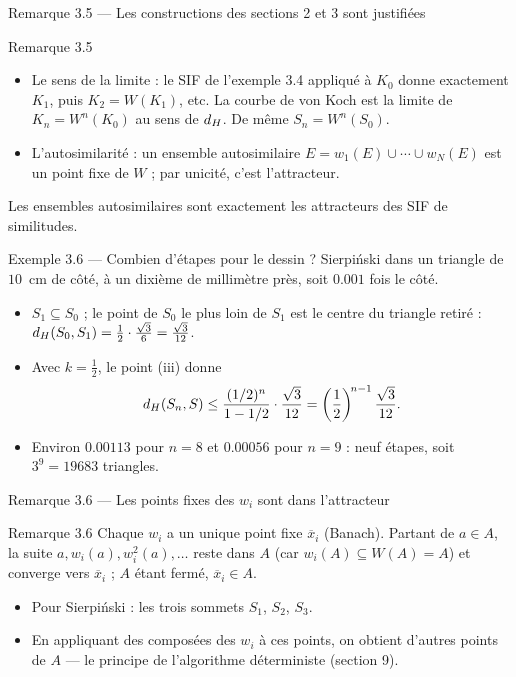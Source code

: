 \begin{frame}{Remarque 3.5 --- Les constructions des sections 2 et 3 sont justifiées}
  \begin{Rem}{Remarque 3.5}
    \small
    \begin{itemize}
      \item Le sens de la limite : le SIF de l'exemple 3.4 appliqué à
        $K_0$ donne exactement $K_1$, puis $K_2=W(K_1)$, etc. La courbe de
        von Koch est la limite de $K_n=W^n(K_0)$ au sens de $d_H$. De même
        $S_n=W^n(S_0)$.
      \item L'autosimilarité : un ensemble autosimilaire
        $E=w_1(E)\cup\cdots\cup w_N(E)$ est un point fixe de $W$ ; par
        unicité, c'est l'attracteur.
    \end{itemize}
    Les ensembles autosimilaires sont exactement les attracteurs des SIF
    de similitudes.
  \end{Rem}
\end{frame}

\begin{frame}{Exemple 3.6 --- Combien d'étapes pour le dessin ?}
  \small Sierpiński dans un triangle de $10$~cm de côté, à un dixième de
  millimètre près, soit $\num{0.001}$ fois le côté.
  \begin{itemize}
    \item $S_1\subseteq S_0$ ; le point de $S_0$ le plus loin de $S_1$
      est le centre du triangle retiré :
      $d_H(S_0,S_1) = \tfrac12\cdot\tfrac{\sqrt3}{6} = \tfrac{\sqrt3}{12}$.
    \item Avec $k=\tfrac12$, le point (iii) donne
      \[
        d_H(S_n,S)\leq\frac{(1/2)^n}{1-1/2}\cdot\frac{\sqrt3}{12}
        = \left(\frac12\right)^{\!n-1}\frac{\sqrt3}{12}.
      \]
    \item Environ $\num{0.00113}$ pour $n=8$ et $\num{0.00056}$ pour
      $n=9$ : neuf étapes, soit $3^9=\num{19683}$ triangles.
  \end{itemize}
\end{frame}

\begin{frame}{Remarque 3.6 --- Les points fixes des $w_i$ sont dans l'attracteur}
  \begin{Rem}{Remarque 3.6}
    \small Chaque $w_i$ a un unique point fixe $\overline{x}_i$ (Banach).
    Partant de $a\in A$, la suite $a,w_i(a),w_i^2(a),\ldots$ reste dans
    $A$ (car $w_i(A)\subseteq W(A)=A$) et converge vers
    $\overline{x}_i$ ; $A$ étant fermé, $\overline{x}_i\in A$.
  \end{Rem}
  \small
  \begin{itemize}
    \item Pour Sierpiński : les trois sommets $S_1$, $S_2$, $S_3$.
    \item En appliquant des composées des $w_i$ à ces points, on obtient
      d'autres points de $A$ --- le principe de l'algorithme
      déterministe (section 9).
  \end{itemize}
\end{frame}
